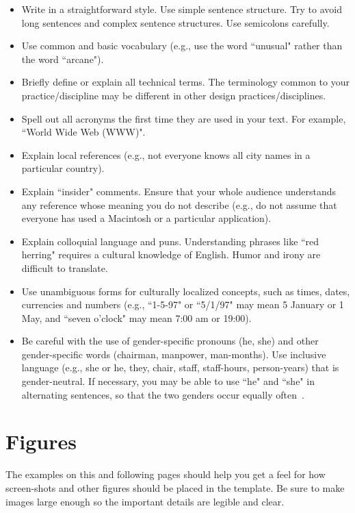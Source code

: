 \documentclass{chi-ext}
\begin{document}
\begin{itemize}\compresslist
\item 	
Write in a straightforward style. 
Use simple sentence structure. 
Try to avoid long sentences and complex sentence structures. 
Use semicolons carefully.
\item 	
Use common and basic vocabulary (e.g., use the word ``unusual" rather than the word ``arcane").
\item 	
Briefly define or explain all technical terms. 
The terminology common to your practice/discipline may be different in other design practices/disciplines.
\item 	
Spell out all acronyms the first time they are used in your text. 
For example, ``World Wide Web (WWW)".
\item 	
Explain local references (e.g., not everyone knows all city names in a particular country).
\item 	
Explain ``insider" comments. 
Ensure that your whole audience understands any reference whose meaning you do not describe (e.g., do not assume that everyone has used a Macintosh or a particular application).
\item 	
Explain colloquial language and puns. 
Understanding phrases like ``red herring" requires a cultural knowledge of English. 
Humor and irony are difficult to translate.
\item 	
Use unambiguous forms for culturally localized concepts, such as times, dates, currencies and numbers (e.g., ``1-5-97" or ``5/1/97" may mean 5 January or 1 May, and ``seven o'clock" may mean 7:00 am or 19:00).
\item 	
Be careful with the use of gender-specific pronouns (he, she) and other gender-specific words (chairman, manpower, man-months). 
Use inclusive language (e.g., she or he, they, chair, staff, staff-hours, person-years) that is gender-neutral. 
If necessary, you may be able to use ``he" and ``she" in alternating sentences, so that the two genders occur equally often~\cite{Schwartz95}. 
\end{itemize}


\section{Figures}
The examples on this and following pages should help you get a feel for how screen-shots and other figures should be placed in the template. 
Be sure to make images large enough so the important details are legible and clear.
\end{document}
